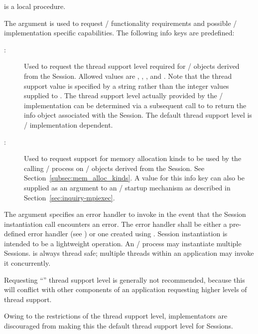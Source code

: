 \noindent
{} is a local procedure.\flushline

The  argument is used to request \MPI/ functionality requirements and possible \MPI/ implementation specific capabilities.  The following info keys are predefined:

\begin{description}
\item[:] Used to request the thread support level required for \MPI/ objects
derived from the Session.  Allowed values are , , , and .  Note that the thread support value is specified by a string rather than the integer
values supplied to .  The thread support level actually provided by the \MPI/ implementation
can be determined via a subsequent call to  to return the info object associated with
the Session.  The default thread support level is \MPI/ implementation dependent.
\item[:]
Used to request support for memory allocation kinds to be used by the calling \MPI/ process on \MPI/ objects derived from the Session.
See Section~\ref{subsec:mem_alloc_kinds}.
A value for this info key can also be supplied as an argument to an \MPI/ startup mechanism as described in Section~\ref{sec:inquiry-mpiexec}.
\end{description}

The  argument specifies an error handler to invoke in the event that the
Session instantiation call encounters an error.
The error handler shall be either a pre-defined error handler (see )
or one created using .
Session instantiation is intended to be a lightweight operation.
An \MPI/ process may instantiate multiple Sessions.  is always thread safe; multiple threads
within an application may invoke it concurrently.

\begin{users}
Requesting ``'' thread support level is generally not recommended, because this will conflict with other components of an application requesting higher levels of thread support.
\end{users}

\begin{implementors}
Owing to the restrictions of the  thread support level, implementators are discouraged from making this the default thread support level for Sessions.
\end{implementors}


